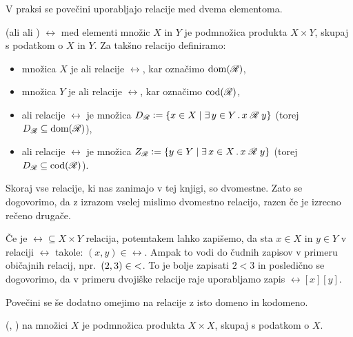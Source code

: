 
                V praksi se povečini uporabljajo relacije med dvema elementoma.
                \begin{definicija}
                         (ali  ali )  $\rel$ med elementi množic $X$ in $Y$ je podmnožica produkta $X \times Y$, skupaj s podatkom o $X$ in $Y$. Za takšno relacijo definiramo:
                        \begin{itemize}
                                \item
                                        množica $X$ je  ali  relacije $\rel$, kar označimo $\dom(\rel)$,
                                \item
                                        množica $Y$ je  ali  relacije $\rel$, kar označimo $\cod(\rel)$,
                                \item
                                         ali  relacije $\rel$ je množica $\dd{\rel} \dfeq \set{x \in X}{\xsome{y}[Y]{\rel[x][y]}}$ (torej $\dd{\rel} \subseteq \dom(\rel)$),
                                \item
                                         ali   relacije $\rel$ je množica $\rn{\rel} \dfeq \set{y \in Y}{\xsome{x}[X]{\rel[x][y]}}$ (torej $\dd{\rel} \subseteq \cod(\rel)$).
                        \end{itemize}
                \end{definicija}

                Skoraj vse relacije, ki nas zanimajo v tej knjigi, so dvomestne. Zato se dogovorimo, da z izrazom  vselej mislimo dvomestno relacijo, razen če je izrecno rečeno drugače.

                Če je $\rel \subseteq X \times Y$ relacija, potemtakem lahko zapišemo, da sta $x \in X$ in $y \in Y$ v relaciji $\rel$ takole: $(x, y) \in \rel$. Ampak to vodi do čudnih zapisov v primeru običajnih relacij, npr.~$(2, 3) \in \mathnormal{<}$. To je bolje zapisati $2 < 3$ in posledično se dogovorimo, da v primeru dvojiške relacije raje uporabljamo zapis $\rel[x][y]$.

                Povečini se še dodatno omejimo na relacije z isto domeno in kodomeno.
                \begin{definicija}
                         (, )  na množici $X$ je podmnožica produkta $X \times X$, skupaj s podatkom o $X$.
                \end{definicija}

